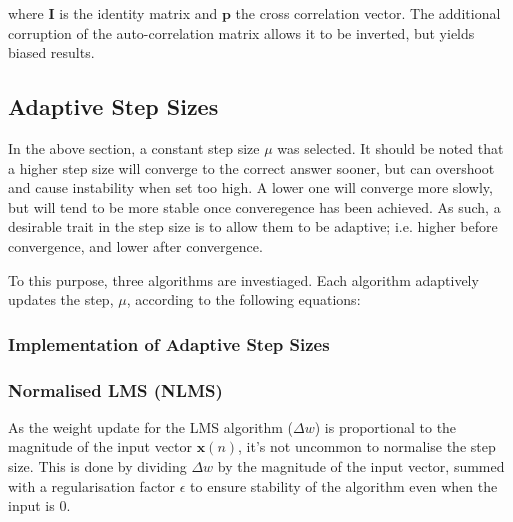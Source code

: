 \documentclass[main.tex]{subfiles}
\begin{document}
where $\textbf{I}$ is the identity matrix and $\textbf{p}$ the cross correlation vector. The additional corruption of the auto-correlation matrix allows it to be inverted, but yields biased results.



















\subsection{Adaptive Step Sizes}

In the above section, a constant step size $\mu$ was selected. It should be noted that a higher step size will converge to the correct answer sooner, but can overshoot and cause instability when set too high. A lower one will converge more slowly, but will tend to be more stable once converegence has been achieved. As such, a desirable trait in the step size is to allow them to be adaptive; i.e. higher before convergence, and lower after convergence. 

To this purpose, three algorithms are investiaged. Each algorithm adaptively updates the step, $\mu$, according to the following equations:



	
\subsubsection{Implementation of Adaptive Step Sizes}






\subsubsection{Normalised LMS (NLMS)}

As the weight update for the LMS algorithm ($\Delta w$) is proportional to the magnitude of the input vector $\textbf{x}(n)$, it's not uncommon to normalise the step size. This is done by dividing $\Delta w$ by the magnitude of the input vector, summed with a regularisation factor $\epsilon$ to ensure stability of the algorithm even when the input is 0.
\end{document}
